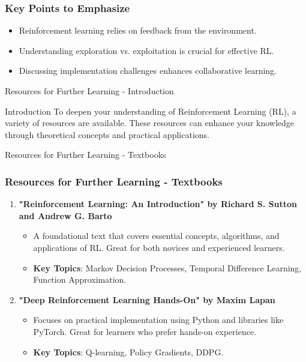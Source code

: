 \documentclass[aspectratio=169]{beamer}
\begin{document}
\begin{frame}[fragile]
    \frametitle{Key Points to Emphasize}
    \begin{itemize}
        \item Reinforcement learning relies on feedback from the environment.
        \item Understanding exploration vs. exploitation is crucial for effective RL.
        \item Discussing implementation challenges enhances collaborative learning.
    \end{itemize}
\end{frame}

\begin{frame}[fragile]{Resources for Further Learning - Introduction}
\begin{block}{Introduction}
To deepen your understanding of Reinforcement Learning (RL), a variety of resources are available. These resources can enhance your knowledge through theoretical concepts and practical applications.
\end{block}
\end{frame}

\begin{frame}[fragile]{Resources for Further Learning - Textbooks}
\frametitle{Resources for Further Learning - Textbooks}
\begin{enumerate}
    \item \textbf{"Reinforcement Learning: An Introduction" by Richard S. Sutton and Andrew G. Barto} 
    \begin{itemize}
        \item A foundational text that covers essential concepts, algorithms, and applications of RL. Great for both novices and experienced learners.
        \item \textbf{Key Topics}: Markov Decision Processes, Temporal Difference Learning, Function Approximation.
    \end{itemize}
    
    \item \textbf{"Deep Reinforcement Learning Hands-On" by Maxim Lapan} 
    \begin{itemize}
        \item Focuses on practical implementation using Python and libraries like PyTorch. Great for learners who prefer hands-on experience.
        \item \textbf{Key Topics}: Q-learning, Policy Gradients, DDPG.
    \end{itemize}
\end{enumerate}
\end{frame}
\end{document}
